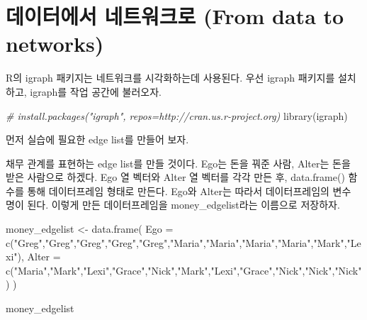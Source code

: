 \documentclass[
]{book}
\newenvironment{Shaded}{\begin{snugshade}}{\end{snugshade}}
\newcommand{\AttributeTok}[1]{\textcolor[rgb]{0.77,0.63,0.00}{#1}}
\newcommand{\CommentTok}[1]{\textcolor[rgb]{0.56,0.35,0.01}{\textit{#1}}}
\newcommand{\FunctionTok}[1]{\textcolor[rgb]{0.00,0.00,0.00}{#1}}
\newcommand{\NormalTok}[1]{#1}
\newcommand{\OtherTok}[1]{\textcolor[rgb]{0.56,0.35,0.01}{#1}}
\newcommand{\StringTok}[1]{\textcolor[rgb]{0.31,0.60,0.02}{#1}}
\begin{document}
\hypertarget{uxb370uxc774uxd130uxc5d0uxc11c-uxb124uxd2b8uxc6ccuxd06cuxb85c-from-data-to-networks}{%
\section{데이터에서 네트워크로 (From data to networks)}\label{uxb370uxc774uxd130uxc5d0uxc11c-uxb124uxd2b8uxc6ccuxd06cuxb85c-from-data-to-networks}}

R의 igraph 패키지는 네트워크를 시각화하는데 사용된다. 우선 igraph 패키지를 설치하고, igraph를 작업 공간에 불러오자.

\begin{Shaded}
\begin{Highlighting}[]
\CommentTok{\# install.packages("igraph", repos=\textquotesingle{}http://cran.us.r{-}project.org\textquotesingle{})}
\FunctionTok{library}\NormalTok{(igraph)}
\end{Highlighting}
\end{Shaded}

먼저 실습에 필요한 edge list를 만들어 보자.

채무 관계를 표현하는 edge list를 만들 것이다. Ego는 돈을 꿔준 사람, Alter는 돈을 받은 사람으로 하겠다. Ego 열 벡터와 Alter 열 벡터를 각각 만든 후, data.frame() 함수를 통해 데이터프레임 형태로 만든다. Ego와 Alter는 따라서 데이터프레임의 변수 명이 된다. 이렇게 만든 데이터프레임을 money\_edgelist라는 이름으로 저장하자.

\begin{Shaded}
\begin{Highlighting}[]
\NormalTok{money\_edgelist }\OtherTok{\textless{}{-}} \FunctionTok{data.frame}\NormalTok{(}
  \AttributeTok{Ego =} \FunctionTok{c}\NormalTok{(}\StringTok{"Greg"}\NormalTok{,}\StringTok{"Greg"}\NormalTok{,}\StringTok{"Greg"}\NormalTok{,}\StringTok{"Greg"}\NormalTok{,}\StringTok{"Greg"}\NormalTok{,}\StringTok{"Maria"}\NormalTok{,}\StringTok{"Maria"}\NormalTok{,}\StringTok{"Maria"}\NormalTok{,}\StringTok{"Maria"}\NormalTok{,}\StringTok{"Mark"}\NormalTok{,}\StringTok{"Lexi"}\NormalTok{),}
  \AttributeTok{Alter =} \FunctionTok{c}\NormalTok{(}\StringTok{"Maria"}\NormalTok{,}\StringTok{"Mark"}\NormalTok{,}\StringTok{"Lexi"}\NormalTok{,}\StringTok{"Grace"}\NormalTok{,}\StringTok{"Nick"}\NormalTok{,}\StringTok{"Mark"}\NormalTok{,}\StringTok{"Lexi"}\NormalTok{,}\StringTok{"Grace"}\NormalTok{,}\StringTok{"Nick"}\NormalTok{,}\StringTok{"Nick"}\NormalTok{,}\StringTok{"Nick"}\NormalTok{)}
\NormalTok{  )}

\NormalTok{money\_edgelist}
\end{Highlighting}
\end{Shaded}
\end{document}
